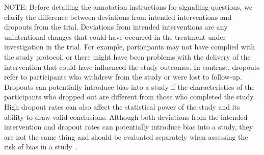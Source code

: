 \documentclass[sn-mathphys,Numbered]{sn-jnl}%
\begin{document}
NOTE: Before detailing the annotation instructions for signalling questions, we clarify the difference between deviations from intended interventions and dropouts from the trial.
Deviations from intended interventions are any unintentional changes that could have occurred in the treatment under investigation in the trial.
For example, participants may not have complied with the study protocol, or there might have been problems with the delivery of the intervention that could have influenced the study outcomes.
In contrast, dropouts refer to participants who withdrew from the study or were lost to follow-up.
Dropouts can potentially introduce bias into a study if the characteristics of the participants who dropped out are different from those who completed the study.
High dropout rates can also affect the statistical power of the study and its ability to draw valid conclusions.
Although both deviations from the intended intervention and dropout rates can potentially introduce bias into a study, they are not the same thing and should be evaluated separately when assessing the risk of bias in a study~\cite{imel2013meta,cedenilla2023psychosocial}.
%
%
%
\end{document}
